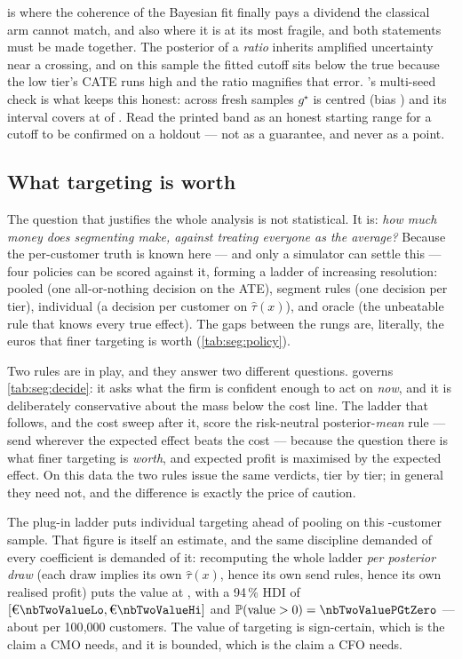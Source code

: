  is where the coherence of the Bayesian fit finally pays a dividend the classical
arm cannot match, and also where it is at its most fragile, and both statements must be made
together. The posterior of a \emph{ratio} inherits amplified uncertainty near a crossing, and on this
sample the fitted cutoff sits below the true \nbTwoTrueGstar{} because the low tier's CATE runs
\eur{\nbTwoSampleErrLow} high and the ratio magnifies that error. 's multi-seed check is what keeps
this honest: across fresh samples $g^\star$ is centred (bias \nbTwoSeedGstarBias) and its interval
covers at \nbTwoSeedGstarCov{} of \nbTwoNSeeds. Read the printed band as an honest starting range for
a cutoff to be confirmed on a holdout --- not as a guarantee, and never as a point.

\subsection*{What targeting is worth}

The question that justifies the whole analysis is not statistical. It is: \emph{how much money does
segmenting make, against treating everyone as the average?} Because the per-customer truth is known
here --- and only a simulator can settle this --- four policies can be scored against it, forming a
ladder of increasing resolution: pooled (one all-or-nothing decision on the ATE), segment rules (one
decision per tier), individual (a decision per customer on $\hat\tau(x)$), and oracle (the unbeatable
rule that knows every true effect). The gaps between the rungs are, literally, the euros that finer
targeting is worth (\cref{tab:seg:policy}).

Two rules are in play, and they answer two different questions.  governs
\cref{tab:seg:decide}: it asks what the firm is confident enough to act on \emph{now}, and it is
deliberately conservative about the mass below the cost line. The ladder that follows, and the cost
sweep after it, score the risk-neutral posterior-\emph{mean} rule --- send wherever the expected
effect beats the cost --- because the question there is what finer targeting is \emph{worth}, and
expected profit is maximised by the expected effect. On this data the two rules issue the same
verdicts, tier by tier; in general they need not, and the difference is exactly the price of
caution.



The plug-in ladder puts individual targeting \eur{\nbTwoValuePlugin} ahead of pooling on this
\nbTwoN-customer sample. That figure is itself an estimate, and the same discipline demanded of every
coefficient is demanded of it: recomputing the whole ladder \emph{per posterior draw} (each draw
implies its own $\hat\tau(x)$, hence its own send rules, hence its own realised profit) puts the
value at \eur{\nbTwoValueTargeting}, with a 94\,\% HDI of
$[\eur{\nbTwoValueLo}, \eur{\nbTwoValueHi}]$ and $\Prob(\text{value} > 0) = \nbTwoValuePGtZero$ ---
about \eur{\nbTwoValuePerHundredk} per 100{,}000 customers. The value of targeting is sign-certain,
which is the claim a CMO needs, and it is bounded, which is the claim a CFO needs.


